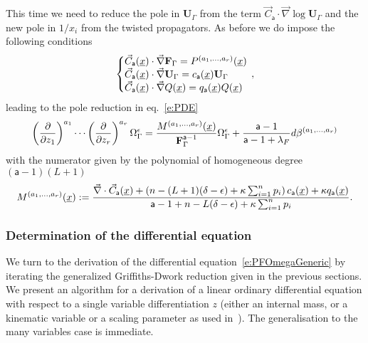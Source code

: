 \documentclass[a4paper,12pt]{article}
\numberwithin{equation}{section}
\numberwithin{figure}{section}
\begin{document}
%
This time we need to reduce the pole in $\mathbf{U}_\Gamma$ from  the term $\vec
    C_{\mathsf{a}}\cdot\vec\nabla\log\mathbf{U}_\Gamma$ and the new
    pole in $1/x_i$ from the twisted propagators.
    As before we do impose the following conditions
\begin{equation}\label{e:sysCFUAnReg}
   \left\{\begin{array}{@{}l@{}}
\vec C_{\mathsf{a}} (\underline x) \cdot \vec \nabla \textbf{F}_\Gamma
            =    P^{(a_1,\dots,a_r)}(\underline x)\\
\vec C_{\mathsf{a}} (\underline x)\cdot\vec \nabla\textbf{U}_\Gamma=
            c_{{\mathsf{a}}}(\underline x) \textbf{U}_\Gamma \\
            \vec C_{\mathsf{a}} (\underline x)\cdot\vec \nabla
            Q(\underline x)=
            q_{{\mathsf{a}}}(\underline x) Q(\underline x)
  \end{array}\right.\,,
\end{equation}
leading to the pole  reduction in eq.~\eqref{e:PDE} 
% 
\begin{equation}\label{e:RedFinalAnReg}
\left(\partial\over \partial z_1\right)^{a_1}\cdots\left(\partial
  \over\partial z_r\right)^{a_r} \Omega_\Gamma^\epsilon={
M^{(a_1,\dots,a_r)}
     (\underline x)
\over \textbf{F}_\Gamma^{\mathsf{a}-1}}\Omega_\Gamma^\epsilon
+{  \mathsf{a}-1 \over \mathsf{a}-1+\lambda_F} d\beta^{(a_1,\dots,a_r)}
\end{equation}
with the numerator given by the polynomial of homogeneous degree $(\mathsf{a}-1)(L+1)$
\begin{equation}
  \label{e:MfinalAnReg}
  M^{(a_1,\dots,a_r)}(\underline x):={
\vec\nabla \cdot \vec C_{\mathsf{a}}
     (\underline x)
+   \left(n-(L+1)(\delta-\epsilon)+\kappa\sum_{i=1}^n p_i\right) 
    c_{\mathsf{a}}(\underline x)+\kappa q_{\mathsf{a}}(\underline x)\over
    \mathsf{a}-1+n-L(\delta-\epsilon)+\kappa\sum_{i=1}^n p_i}.
\end{equation}
%


\subsubsection{Determination of the differential equation}
\label{sec:deriv-diff-equat}


We turn to the derivation of the differential
equation~\eqref{e:PFOmegaGeneric}  by iterating the generalized
Griffiths-Dwork reduction given in the previous sections. We present an algorithm for a derivation of
a linear ordinary differential equation with respect to a single
variable differentiation $z$ (either an internal mass, or a kinematic
variable or a scaling parameter as used
in~\cite{Lairez:2022zkj,Doran:2023yzu}). The generalisation to the
many variables case is immediate.
\end{document}
